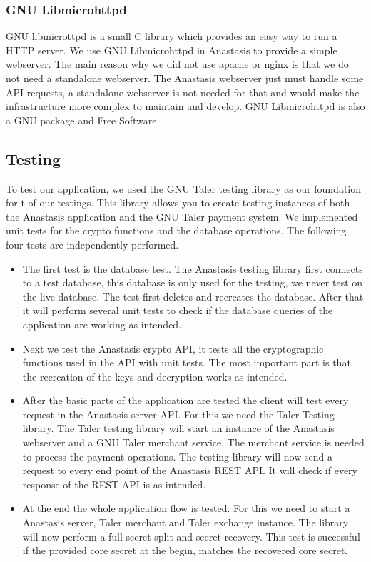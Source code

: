 \subsubsection{GNU Libmicrohttpd}

GNU libmicrottpd is a small C library which provides an easy way to
run a HTTP server.  We use GNU Libmicrohttpd in Anastasis to provide a
simple webserver. The main reason why we did not use apache or nginx
is that we do not need a standalone webserver. The Anastasis webserver
just must handle some API requests, a standalone webserver is not
needed for that and would make the infrastructure more complex to
maintain and develop.  GNU Libmicrohttpd is also a GNU package
and Free Software.~\cite{libmicrohttpd}

\subsection{Testing}

To test our application, we used the GNU Taler testing library as our
foundation for t of our testings.  This library allows you to create testing instances of
both the Anastasis application and the GNU Taler payment system. We
implemented unit tests for the crypto functions and the database operations.
The following four tests are independently performed.

\begin{itemize}
\item The first test is the database test. The Anastasis testing library first connects to a test database, this database is only used for the testing, we never test on the live database. The test first deletes and recreates the database. After that it will perform several unit tests to check if the database queries of the application are working as intended.
\item Next we test the Anastasis crypto API, it tests all the
cryptographic functions used in the API with unit tests.
The most important part is  that the recreation of the keys
and decryption works as intended.
\item After the basic parts of the application are tested the client
will test every request in the Anastasis server API. For this we need the
Taler Testing library. The Taler testing library will start an instance
of the Anastasis webserver and a GNU Taler merchant service. The merchant
service is needed to process the payment operations. The testing library
will now send a request to every end point of the Anastasis REST API. It will
check if every response of the REST API is as intended.
\item At the end the whole application flow is tested. For this
we need to start a Anastasis server, Taler merchant and Taler exchange instance.
The library will now perform a full secret split and secret recovery.
This test is successful if the provided core secret at the begin, matches the
recovered core secret.
\end{itemize}
